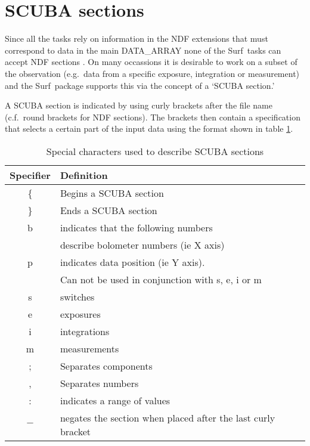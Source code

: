 \documentclass[twoside,11pt]{article}
\newcommand{\scusoft}          {{\sc Surf}}
\newcommand{\xlabel}[1]{}
\begin{document}
\section{\xlabel{sections}SCUBA sections\label{sections}}

Since all the tasks rely on information in the NDF
extensions that must correspond to data in the main DATA\_ARRAY none of the
\scusoft\ tasks can accept NDF sections \cite{ndf}. On many occassions it
is desirable to work on a subset of the observation (e.g.\ data from a
specific exposure, integration or measurement) and the \scusoft\ package 
supports this via the concept of a `SCUBA section.'

A SCUBA section is indicated by using curly brackets after the file
name (c.f.\ round brackets for NDF sections). The brackets then contain
a specification that selects a certain part of the input data
using the format shown in table \ref{scusect}.

\begin{table}
\begin{center}
\begin{tabular}{cl}
\hline \hline
Specifier & Definition \\ \hline
\{  & Begins a SCUBA section \\
\}  & Ends a SCUBA section   \\
b  & indicates that the following numbers \\
   & describe bolometer numbers (ie X axis)\\
p  & indicates data position (ie Y axis). \\
   & Can not be used in conjunction with s, e, i or m\\
s  & switches \\
e  & exposures \\
i  & integrations \\
m  & measurements \\
;  & Separates components   \\
,  & Separates numbers \\
:  & indicates a range of values \\
$-$& negates the section when placed after the last curly bracket \\ \hline
\hline
\end{tabular}

\caption{Special characters used to describe SCUBA sections}

\label{scusect}
\end{center}
\end{table}
\end{document}
